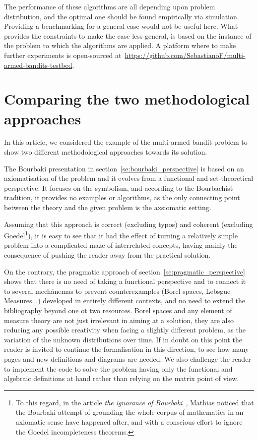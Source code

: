 \documentclass[]{scrartcl}
\theoremstyle{definition}
\begin{document}
The performance of these algorithms are all depending upon problem distribution, and the optimal one should be found empirically via simulation. Providing a benchmarking for a general case would not be useful here. What provides the constraints to make the case less general, is based on the instance of the problem to which the algorithms are applied. A platform where to make further experiments is open-sourced at~\href{https://github.com/SebastianoF/multi-armed-bandits-testbed}{https://github.com/SebastianoF/multi-armed-bandits-testbed}.


\section{Comparing the two methodological approaches}
\label{se:outro}

In this article, we considered the example of the multi-armed bandit problem to show two different methodological approaches towards its solution.

The Bourbaki presentation in section~\ref{se:bourbaki_perspective} is based on an axiomatisation of the problem and it evolves from a functional and set-theoretical perspective. It focuses on the symbolism, and according to the Bourbachist tradition, it provides no examples or algorithms, as the only connecting point between the theory and the given problem is the axsiomatic setting.

Assuming that this approach is correct (excluding typos) and coherent (excluding Goedel\footnote{
    To this regard, in the article \emph{the ignorance of Bourbaki}~\cite{mathias1992ignorance}, Mathias noticed that the Bourbaki attempt of grounding the whole corpus of mathematics in an axiomatic sense have happened after, and with a conscious effort to ignore the Goedel incompleteness theorems.
}), it is easy to see that it had the effect of turning a relatively simple problem into a complicated maze of interrelated concepts, having mainly the consequence of pushing the reader away from the practical solution.

On the contrary, the pragmatic approach of section~\ref{se:pragmatic_perspective} shows that there is no need of taking a functional perspective and to connect it to several mechánemas to prevent counterexamples (Borel spaces, Lebsgue Measures...) developed in entirely different contexts, and no need to extend the bibliography beyond one ot two resources. Borel spaces and any element of measure theory are not just irrelevant in aiming at a solution, they are also reducing any possible creativity when facing a slightly different problem, as the variation of the unknown distributions over time. If in doubt on this point the reader is invited to continue the formalisation in this direction, to see how many pages and new definitions and diagrams are needed. We also challenge the reader to implement the code to solve the problem having only the functional and algebraic definitions at hand rather than relying on the matrix point of view.
\end{document}
